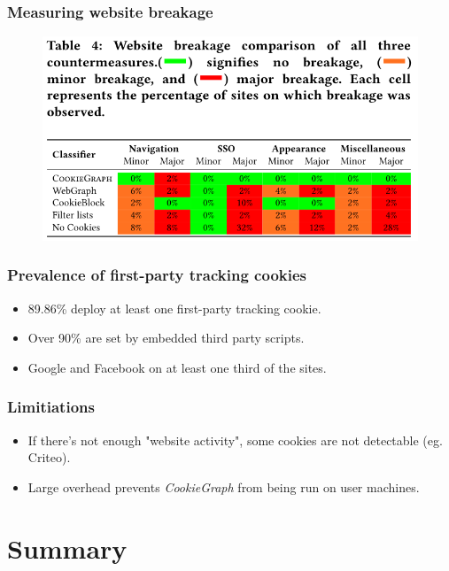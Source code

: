 \documentclass{beamer}
\begin{document}
\begin{frame}
\frametitle{Measuring website breakage}

\begin{figure}
\includegraphics[scale=0.5]{img/breakage}
\end{figure}

\end{frame}

\begin{frame}
\frametitle{Prevalence of first-party tracking cookies}

\begin{itemize}
\item 89.86\% deploy at least one first-party tracking cookie.
\item Over 90\% are set by embedded third party scripts. 
\item Google and Facebook on at least one third of the sites.
\end{itemize}

\end{frame}

\begin{frame}
\frametitle{Limitiations}

\begin{itemize}
\item If there's not enough "website activity", some cookies are not detectable (eg. Criteo).
\item Large overhead prevents \textit{CookieGraph} from being run on user machines.
\end{itemize}

\end{frame}


\section{Summary}
\end{document}

